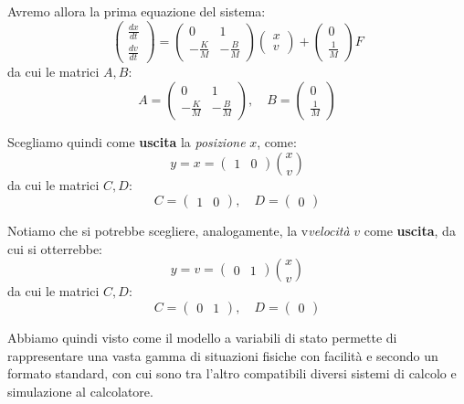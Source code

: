 \documentclass[a4paper,11pt]{article}
\begin{document}
Avremo allora la prima equazione del sistema:
$$
\begin{pmatrix}
	\frac{dx}{dt} \\ 
	\frac{dv}{dt}
\end{pmatrix}
=
\begin{pmatrix}
	0 & 1 \\ 
	-\frac{K}{M} & -\frac{B}{M}
\end{pmatrix}
\begin{pmatrix}
	x \\ 
	v
\end{pmatrix}
+
\begin{pmatrix}
	0 \\ 
	\frac{1}{M}
\end{pmatrix}
F
$$
da cui le matrici $A, B$:
$$
A = 
\begin{pmatrix}
	0 & 1 \\ 
	-\frac{K}{M} & -\frac{B}{M}
\end{pmatrix}, \quad 
B = 
\begin{pmatrix}
	0 \\ 
	\frac{1}{M}
\end{pmatrix}
$$

Scegliamo quindi come \textbf{uscita} la \textit{posizione} $x$, come:
$$
y = x = 
\begin{pmatrix}
	1 & 0
\end{pmatrix}
 \binom{x}{v}
$$
da cui le matrici $C, D$:
$$
C =
\begin{pmatrix}
	1 & 0
\end{pmatrix}, \quad 
D =
\begin{pmatrix}
0
\end{pmatrix}
$$ 

Notiamo che si potrebbe scegliere, analogamente, la v\textit{velocità} $v$ come \textbf{uscita}, da cui si otterrebbe:
$$
y = v = 
\begin{pmatrix}
	0 & 1
\end{pmatrix}
 \binom{x}{v}
$$
da cui le matrici $C, D$:
$$
C =
\begin{pmatrix}
	0 & 1
\end{pmatrix}, \quad 
D =
\begin{pmatrix}
0
\end{pmatrix}
$$

\par\medskip 

Abbiamo quindi visto come il modello a variabili di stato permette di rappresentare una vasta gamma di situazioni fisiche con facilità e secondo un formato standard, con cui sono tra l'altro compatibili diversi sistemi di calcolo e simulazione al calcolatore.
\end{document}
